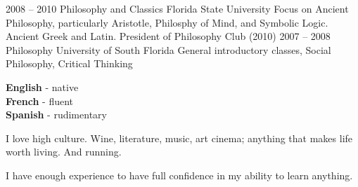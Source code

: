 \documentclass[9pt]{developercv} %
\begin{document}


\begin{entrylist}
	\entry
		{2008 -- 2010}
		{Philosophy and Classics}
		{Florida State University}
        {Focus on Ancient Philosophy, particularly Aristotle, Philosphy of Mind,
        and Symbolic Logic. Ancient Greek and Latin. President of Philosophy
        Club (2010)}
	\entry
		{2007 -- 2008}
		{Philosophy}
		{University of South Florida}
        {General introductory classes, Social Philosophy, Critical Thinking}
\end{entrylist}


\begin{minipage}[t]{0.3\textwidth}
	\vspace{-\baselineskip} %


	\textbf{English} - native\\
	\textbf{French} - fluent\\
	\textbf{Spanish} - rudimentary
\end{minipage}
\hfill
\begin{minipage}[t]{0.3\textwidth}
	\vspace{-\baselineskip} %


	I love high culture. Wine, literature, music, art cinema; anything that
    makes life worth living. And running.
\end{minipage}
\hfill
\begin{minipage}[t]{0.3\textwidth}
	\vspace{-\baselineskip} %


    I have enough experience to have full confidence in my ability to learn
    anything.
\end{minipage}

\end{document}
